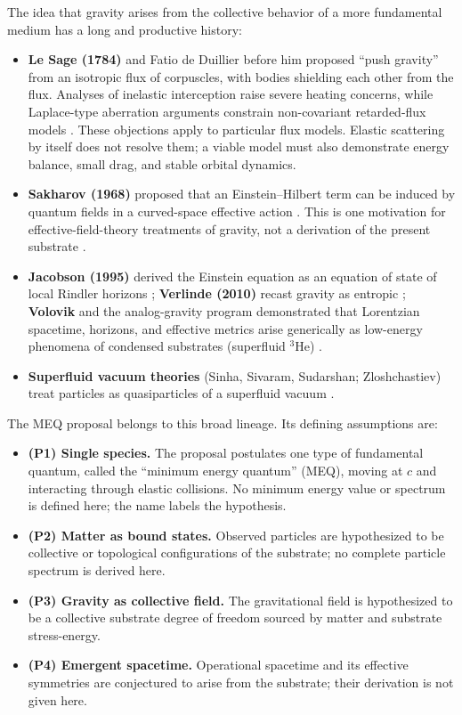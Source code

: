 \documentclass[11pt,a4paper]{article}
\newcommand{\meq}{MEQ}
\begin{document}
The idea that gravity arises from the collective behavior of a more fundamental medium has a long
and productive history:
\begin{itemize}
\item \textbf{Le Sage (1784)} and Fatio de Duillier before him proposed ``push gravity'' from
an isotropic flux of corpuscles, with bodies shielding each other from the flux. Analyses of
inelastic interception raise severe heating concerns, while Laplace-type aberration arguments
constrain non-covariant retarded-flux models \cite{LeSage2002,Poincare1908}. These objections apply
to particular flux models. Elastic scattering by itself does not resolve them; a viable model
must also demonstrate energy balance, small drag, and stable orbital dynamics.
\item \textbf{Sakharov (1968)} proposed that an Einstein--Hilbert term can be induced by quantum
fields in a curved-space effective action \cite{Sakharov1968}. This is one motivation for
effective-field-theory treatments of gravity, not a derivation of the present substrate
\cite{Donoghue1994}.
\item \textbf{Jacobson (1995)} derived the Einstein equation as an equation of state of local
Rindler horizons \cite{Jacobson1995}; \textbf{Verlinde (2010)} recast gravity as entropic
\cite{Verlinde2011}; \textbf{Volovik} and the analog-gravity program demonstrated that Lorentzian
spacetime, horizons, and effective metrics arise generically as low-energy phenomena of
condensed substrates (superfluid $^3$He) \cite{Volovik2003,Barcelo2005}.
\item \textbf{Superfluid vacuum theories} (Sinha, Sivaram, Sudarshan; Zloshchastiev) treat
particles as quasiparticles of a superfluid vacuum \cite{Sinha1976,Zloshchastiev2011}.
\end{itemize}
The \meq{} proposal belongs to this broad lineage. Its defining assumptions are:
\begin{itemize}
\item \textbf{(P1) Single species.} The proposal postulates one type of fundamental quantum, called
the ``minimum energy quantum'' (\meq{}), moving at $c$ and interacting through elastic
collisions. No minimum energy value or spectrum is defined here; the name labels the hypothesis.
\item \textbf{(P2) Matter as bound states.} Observed particles are hypothesized to be collective
or topological configurations of the substrate; no complete particle spectrum is derived here.
\item \textbf{(P3) Gravity as collective field.} The gravitational field is hypothesized to be a
collective substrate degree of freedom sourced by matter and substrate stress-energy.
\item \textbf{(P4) Emergent spacetime.} Operational spacetime and its effective symmetries are
conjectured to arise from the substrate; their derivation is not given here.
\end{itemize}
\end{document}

